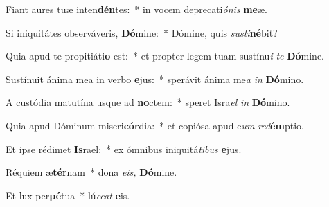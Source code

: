 \item Fiant aures tuæ inten\textbf{dén}tes:~* in vocem deprecati\hspace*{0.01em}\textit{ónis} \textbf{me}æ.
\item Si iniquitátes observáveris, \textbf{Dó}mine:~* Dómine, quis \textit{susti}\hspace{-0.01em}\textbf{né}bit?
\item Quia apud te propitiáti\textbf{o} est:~* et pro\-pter legem tuam sustínu\tinyhspace\textit{i} \textit{te} \textbf{Dó}mine.
\item Sustínuit ánima mea in verbo \textbf{e}jus:~* sperávit ánima me\tinyhspace\textit{a} \textit{in} \textbf{Dó}mino.
\item A custódia matutína usque ad \textbf{no}ctem:~* speret Isra\tinyhspace\textit{el} \textit{in} \textbf{Dó}mino.
\item Quia apud Dóminum miseri\textbf{cór}dia:~* et copiósa apud e\tinyhspace\textit{um} \textit{red}\textbf{ém}ptio.
\item Et ipse rédimet \textbf{Is}rael:~* ex ómnibus iniquitá\tinyhspace\textit{tibus} \textbf{e}jus.
\item Réquiem æ\textbf{tér}nam~* dona \textit{e}\textit{is,} \textbf{Dó}mine.
\item Et lux per\textbf{pé}tua~* lú\tinyhspace\textit{ce}\textit{at} \textbf{e}is.